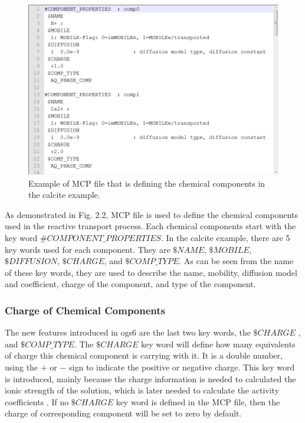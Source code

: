 \begin{figure}
\includegraphics[width=\textwidth]{RT/figs/RT_fig_mcp_file}
\caption{Example of MCP file that is defining the chemical components in the calcite example.}
\label{fig:RT_mcp_file}
\end{figure}

As demonstrated in Fig. 2.2, MCP file is used to define the chemical components used in the reactive transport process. Each chemical components start with the key word $\#COMPONENT\_PROPERTIES$. In the calcite example, there are 5 key words used for each component. They are $\$NAME$, $\$MOBILE$, $\$DIFFUSION$, $\$CHARGE$, and $\$COMP\_TYPE$. As can be seen from the name of these key words, they are used to describe the name, mobility, diffusion model and coefficient, charge of the component, and type of the component. 

\subsubsection{Charge of Chemical Components}

The new features introduced in ogs6 are the last two key words, the $\$CHARGE$ , and $\$COMP\_TYPE$. The $\$CHARGE$ key word will define how many equivalents of charge this chemical component is carrying with it. It is a double number, using the $+$ or $-$ sign to indicate the positive or negative charge. This key word is introduced, mainly because the charge information is needed to calculated the ionic strength of the solution, which is later needed to calculate the activity coefficients . If no $\$CHARGE$ key word is defined in the MCP file, then the charge of corresponding component will be set to zero by default. 

